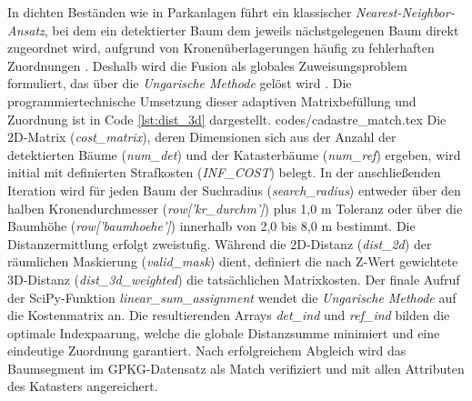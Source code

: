 In dichten Beständen wie in Parkanlagen führt ein klassischer \textit{Nearest-Neighbor-Ansatz}, bei dem ein detektierter Baum dem jeweils nächstgelegenen Baum direkt zugeordnet wird, aufgrund von Kronenüberlagerungen häufig zu fehlerhaften Zuordnungen \cite{munzingerMappingUrbanForest2022}. Deshalb wird die Fusion als globales Zuweisungsproblem formuliert, das über die \textit{Ungarische Methode} gelöst wird \cite{murrayARBORNewFramework2019}. Die programmiertechnische Umsetzung dieser adaptiven Matrixbefüllung und Zuordnung ist in Code \ref{lst:dist_3d} dargestellt.
 {codes/cadastre_match.tex}
Die 2D-Matrix (\textit{cost\_matrix}), deren Dimensionen sich aus der Anzahl der detektierten Bäume (\textit{num\_det}) und der Katasterbäume (\textit{num\_ref}) ergeben, wird initial mit definierten Strafkosten (\textit{INF\_COST}) belegt. In der anschließenden Iteration wird für jeden Baum der Suchradius (\textit{search\_radius}) entweder über den halben Kronendurchmesser (\textit{row['kr\_durchm']}) plus 1,0 m Toleranz oder über die Baumhöhe (\textit{row['baumhoehe']}) innerhalb von 2,0 bis 8,0 m bestimmt. Die Distanzermittlung erfolgt zweistufig. Während die 2D-Distanz (\textit{dist\_2d}) der räumlichen Maskierung (\textit{valid\_mask}) dient, definiert die nach Z-Wert gewichtete 3D-Distanz (\textit{dist\_3d\_weighted}) die tatsächlichen Matrixkosten. Der finale Aufruf der SciPy-Funktion \textit{linear\_sum\_assignment} wendet die \textit{Ungarische Methode} auf die Kostenmatrix an. Die resultierenden Arrays \textit{det\_ind} und \textit{ref\_ind} bilden die optimale Indexpaarung, welche die globale Distanzsumme minimiert und eine eindeutige Zuordnung garantiert. Nach erfolgreichem Abgleich wird das Baumsegment im GPKG-Datensatz als Match verifiziert und mit allen Attributen des Katasters angereichert.
